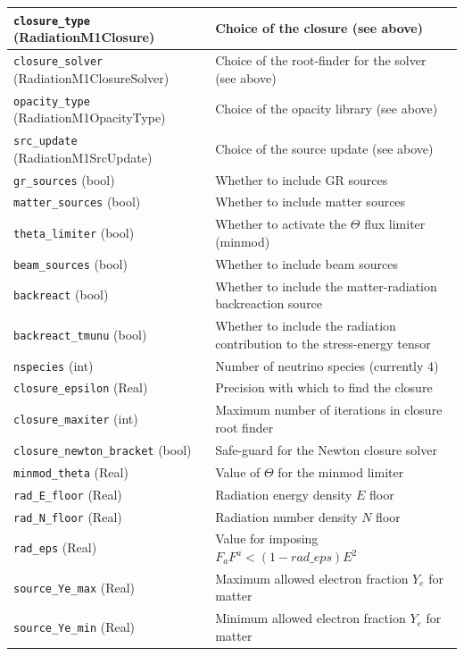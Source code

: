 \documentclass{article}
\newcommand{\var}[1]{%
  {\setlength{\fboxsep}{1.5pt}%
   \colorbox{varbg}{\textcolor{varfg}{\texttt{\small #1}}}}}
\begin{document}
\begin{itemize}
\begin{tabularx}{\textwidth}{|l|X|}
    \hline
    \var{closure\_type} (RadiationM1Closure)&Choice of the closure (see above)\\
    \hline
    \var{closure\_solver} (RadiationM1ClosureSolver)&Choice of the root-finder for the solver (see above)\\
    \hline
    \var{opacity\_type} (RadiationM1OpacityType)&Choice of the opacity library (see above)\\
    \hline
    \var{src\_update} (RadiationM1SrcUpdate)&Choice of the source update (see above)\\
    \hline
    \var{gr\_sources} (bool)&Whether to include GR sources\\
    \hline
    \var{matter\_sources} (bool)&Whether to include matter sources\\
    \hline
    \var{theta\_limiter} (bool)&Whether to activate the $\Theta$ flux limiter (minmod)\\
    \hline
    \var{beam\_sources} (bool)&Whether to include beam sources\\
    \hline
    \var{backreact} (bool)&Whether to include the matter-radiation backreaction source\\
    \hline
    \var{backreact\_tmunu} (bool)&Whether to include the radiation contribution to the stress-energy tensor\\
    \hline
    \var{nspecies} (int)&Number of neutrino species (currently 4)\\
    \hline
    \var{closure\_epsilon} (Real)&Precision with which to find the closure\\
    \hline
    \var{closure\_maxiter} (int)&Maximum number of iterations in closure root finder\\
    \hline
    \var{closure\_newton\_bracket} (bool)&Safe-guard for the Newton closure solver\\
    \hline
    \var{minmod\_theta} (Real)&Value of $\Theta$ for the minmod limiter\\
    \hline
    \var{rad\_E\_floor} (Real)&Radiation energy density $E$ floor\\
    \hline
    \var{rad\_N\_floor} (Real)&Radiation number density $N$ floor\\
    \hline
    \var{rad\_eps} (Real)&Value for imposing $F_aF^a<(1-rad\_eps)E^2$\\
    \hline
    \var{source\_Ye\_max} (Real)&Maximum allowed electron fraction $Y_e$ for matter\\
    \hline
    \var{source\_Ye\_min} (Real)&Minimum allowed electron fraction $Y_e$ for matter\\

\end{tabularx}
\end{itemize}
\end{document}
